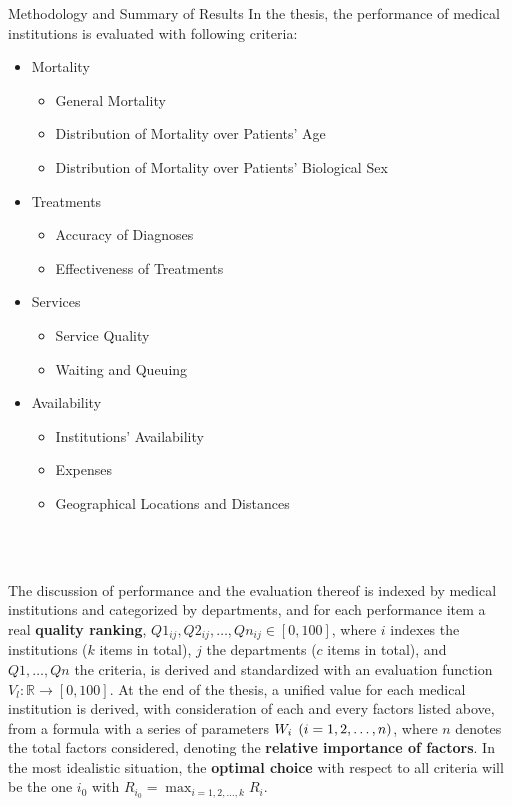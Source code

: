 \documentclass[8pt, hyperref={colorlinks=true}]{beamer}
\begin{document}
\begin{frame}{Methodology and Summary of Results}
In the thesis, the performance of medical institutions is evaluated with following criteria:
  \begin{itemize}
  \item{
    Mortality
    \begin{itemize}
        \item General Mortality
        \item Distribution of Mortality over Patients' Age
        \item Distribution of Mortality over Patients' Biological Sex
    \end{itemize}
  }
  \item{
    Treatments
    \begin{itemize}
        \item Accuracy of Diagnoses
        \item Effectiveness of Treatments
    \end{itemize}
  }
  \item{
    Services
    \begin{itemize}
        \item Service Quality
        \item Waiting and Queuing
    \end{itemize}
  }
  \item{
    Availability
    \begin{itemize}
        \item Institutions' Availability
        \item Expenses
        \item Geographical Locations and Distances
    \end{itemize}
  }
  \end{itemize}\\~\
  
The discussion of performance and the evaluation thereof is indexed by medical institutions and categorized by departments, and for each performance item a real \textbf{quality ranking}, $Q1_{ij},Q2_{ij},\dots,Qn_{ij}\in[0,100]$, where $i$ indexes the institutions ($k$ items in total), $j$ the departments ($c$ items in total), and $Q1,\dots,Qn$ the criteria, is derived and standardized with an evaluation function $V_l:\mathbb{R}\to[0,100]$. At the end of the thesis, a unified value for each medical institution is derived, with consideration of each and every factors listed above, from a formula with a series of parameters $W_i\mathbin{\hphantom{}}(i=1,2,\dots,n)$, where $n$ denotes the total factors considered, denoting the \textbf{relative importance of factors}. In the most idealistic situation, the \textbf{optimal choice} with respect to all criteria will be the one $i_0$ with $\displaystyle{R_{i_0}=\max_{i=1,2,\dots,k}R_i}$.
\end{frame}
\end{document}

